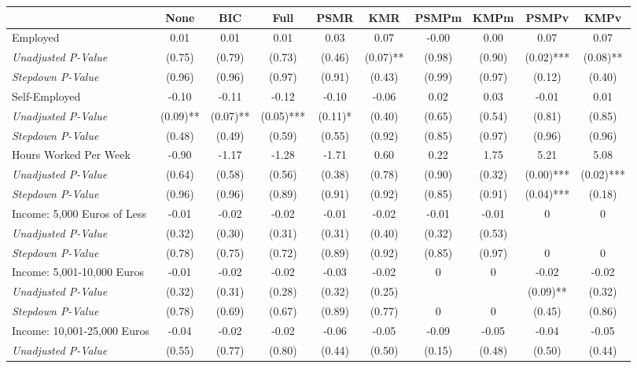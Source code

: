 \begin{tabular}{l c c c c c c c c c}
\toprule
 & None & BIC & Full & PSMR & KMR & PSMPm & KMPm & PSMPv & KMPv \\
\midrule
Employed & 0.01 & 0.01 & 0.01 & 0.03 & 0.07 & -0.00 & 0.00 & 0.07 & 0.07 \\
\quad \textit{Unadjusted P-Value} & (0.75) & (0.79) & (0.73) & (0.46) & (0.07)** & (0.98) & (0.90) & (0.02)*** & (0.08)** \\
\quad \textit{Stepdown P-Value} & (0.96) & (0.96) & (0.97) & (0.91) & (0.43) & (0.99) & (0.97) & (0.12) & (0.40) \\
Self-Employed & -0.10 & -0.11 & -0.12 & -0.10 & -0.06 & 0.02 & 0.03 & -0.01 & 0.01 \\
\quad \textit{Unadjusted P-Value} & (0.09)** & (0.07)** & (0.05)*** & (0.11)* & (0.40) & (0.65) & (0.54) & (0.81) & (0.85) \\
\quad \textit{Stepdown P-Value} & (0.48) & (0.49) & (0.59) & (0.55) & (0.92) & (0.85) & (0.97) & (0.96) & (0.96) \\
Hours Worked Per Week & -0.90 & -1.17 & -1.28 & -1.71 & 0.60 & 0.22 & 1.75 & 5.21 & 5.08 \\
\quad \textit{Unadjusted P-Value} & (0.64) & (0.58) & (0.56) & (0.38) & (0.78) & (0.90) & (0.32) & (0.00)*** & (0.02)*** \\
\quad \textit{Stepdown P-Value} & (0.96) & (0.96) & (0.89) & (0.91) & (0.92) & (0.85) & (0.91) & (0.04)*** & (0.18) \\
Income: 5,000 Euros of Less & -0.01 & -0.02 & -0.02 & -0.01 & -0.02 & -0.01 & -0.01 & 0 & 0 \\
\quad \textit{Unadjusted P-Value} & (0.32) & (0.30) & (0.31) & (0.31) & (0.40) & (0.32) & (0.53) & & \\
\quad \textit{Stepdown P-Value} & (0.78) & (0.75) & (0.72) & (0.89) & (0.92) & (0.85) & (0.97) & 0 & 0 \\
Income: 5,001-10,000 Euros & -0.01 & -0.02 & -0.02 & -0.03 & -0.02 & 0 & 0 & -0.02 & -0.02 \\
\quad \textit{Unadjusted P-Value} & (0.32) & (0.31) & (0.28) & (0.32) & (0.25) & & & (0.09)** & (0.32) \\
\quad \textit{Stepdown P-Value} & (0.78) & (0.69) & (0.67) & (0.89) & (0.77) & 0 & 0 & (0.45) & (0.86) \\
Income: 10,001-25,000 Euros & -0.04 & -0.02 & -0.02 & -0.06 & -0.05 & -0.09 & -0.05 & -0.04 & -0.05 \\
\quad \textit{Unadjusted P-Value} & (0.55) & (0.77) & (0.80) & (0.44) & (0.50) & (0.15) & (0.48) & (0.50) & (0.44) \\

\end{tabular}
